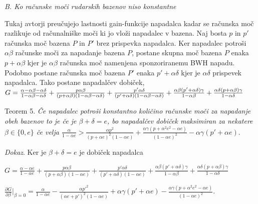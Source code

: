 \documentclass{acm_proc_article-sp}
\begin{document}
\textit{B. Ko računske moči rudarskih bazenov niso konstantne}

Tukaj avtorji preučujejo lastnosti gain-funkcije napadalca kadar se računska moč razlikuje od računalniške moči ki jo vloži napadalec v bazena. Naj bosta \textit{$p$} in \textit{$p'$} računska moč bazena \textit{$P$} in \textit{$P'$} brez prispevka napadalca. Ker napadalec potroši \textit{$\alpha\beta$} računske moči za napadanje bazena \textit{$P$}, postane skupna moč bazena \textit{$P$} enaka \textit{$p + \alpha\beta$} kjer je \textit{$\alpha\beta$} računska moč namenjena sponzoriranemu BWH napadu. Podobno postane računska moč bazena \textit{$P'$} enaka \textit{$p' + \alpha\delta$} kjer je \textit{$\alpha\delta$} prispevek napadalca. Tako postane napadalčev dobiček, \newline
$G = \frac{\alpha - \alpha\beta - \alpha\delta}{1 - \alpha\beta - \alpha\delta} + \frac{p\alpha\beta}{(p+\alpha\beta)(1 - \alpha\beta - \alpha\delta)} + \\ \frac{p'\alpha\delta}{(p' + \alpha\delta)(1 - \alpha\beta - \alpha\delta)} + \frac{\alpha\beta(p' + \alpha\delta)\gamma}{1 - \alpha\beta} + \frac{\alpha\delta(p + \alpha\beta)\gamma}{1 - \alpha\delta}$
\newline

Teorem 5. \textit{Če napadalec potroši konstantno količino računske moči za napadanje obeh bazenov to je če je $\beta + \delta = e$, bo napadalčev dobiček maksimiran za nekatere $\beta \in \{0,e\}$ če velja $\frac{\alpha}{1-\alpha e} > \frac{\alpha p^2}{(p + \alpha e)^2(1 - \alpha e)} + \frac{\alpha\gamma(p+\alpha^2e^2-\alpha e)}{(1-\alpha e)^2} - \alpha\gamma(p' + \alpha e)$}.\newline

\noindent\textit{Dokaz}. Ker je \textit{$\beta + \delta = e$} je dobiček napadalca\newline

\textit{$G = \frac{\alpha - \alpha e}{1 - \alpha e} + \frac{p\alpha\beta}{(p+\alpha\beta)(1-\alpha e)} + \frac{p'\alpha\delta}{(p'+\alpha\delta)(1-\alpha e)} + \frac{\alpha\beta(p' + \alpha\delta)\gamma}{1-\alpha\beta} + \frac{\alpha\delta(p+\alpha\beta)\gamma}{1-\alpha\delta}$}\newline

$\frac{\partial G}{\partial \beta}|_{\beta=0} = \frac{\alpha}{1-\alpha e} -
\frac{\alpha p'^2}{(\alpha e + p')^2(1-\alpha e)} +
\alpha\gamma(p' + \alpha e) - 
\frac{\alpha\gamma(p+\alpha^2 e^2 -\alpha e)}{(1 - \alpha e)^2}$.\newline
\end{document}
